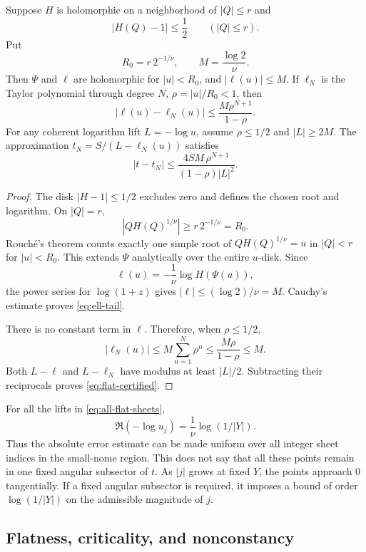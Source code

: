 \begin{theorem}
\label{thm:flat-tail}
Suppose \(H\) is holomorphic on a neighborhood of \(|Q|\le r\)
and
\[
 |H(Q)-1|\le\frac12\qquad (|Q|\le r).
\]
Put
\[
 R_0=r\,2^{-1/\nu},\qquad M=\frac{\log2}{\nu}.
\]
Then \(\Psi\) and \(\ell\) are holomorphic for \(|u|<R_0\),
and \(|\ell(u)|\le M\).
If \(\ell_N\) is the Taylor polynomial through degree \(N\),
\(\rho=|u|/R_0<1\), then
\begin{equation}\label{eq:ell-tail}
 |\ell(u)-\ell_N(u)|
 \le \frac{M\rho^{N+1}}{1-\rho}.
\end{equation}
For any coherent logarithm lift \(L=-\log u\), assume
\(\rho\le1/2\) and \(|L|\ge2M\).
The approximation \(t_N=S/(L-\ell_N(u))\) satisfies
\begin{equation}\label{eq:flat-certified}
 |t-t_N|
 \le
 \frac{4SM\,\rho^{N+1}}{(1-\rho)|L|^2}.
\end{equation}
\end{theorem}
\begin{proof}
The disk \(|H-1|\le1/2\) excludes zero and defines the chosen
root and logarithm.  On \(|Q|=r\),
\[
 |QH(Q)^{1/\nu}|\ge r\,2^{-1/\nu}=R_0.
\]
Rouch\'e's theorem counts exactly one simple root of
\(QH(Q)^{1/\nu}=u\) in \(|Q|<r\) for \(|u|<R_0\).
This extends \(\Psi\) analytically over the entire \(u\)-disk.
Since
\[
 \ell(u)=-\frac1\nu\log H(\Psi(u)),
\]
the power series for \(\log(1+z)\) gives
\(|\ell|\le(\log2)/\nu=M\).
Cauchy's estimate proves \cref{eq:ell-tail}.

There is no constant term in \(\ell\).  Therefore, when
\(\rho\le1/2\),
\[
 |\ell_N(u)|\le M\sum_{n=1}^N\rho^n
                 \le\frac{M\rho}{1-\rho}\le M.
\]
Both \(L-\ell\) and \(L-\ell_N\) have modulus at least
\(|L|/2\).  Subtracting their reciprocals proves
\cref{eq:flat-certified}.
\end{proof}

For all the lifts in \cref{eq:all-flat-sheets},
\[
 \Re(-\log u_j)=\frac1\nu\log(1/|Y|).
\]
Thus the absolute error estimate can be made uniform over all
integer sheet indices in the small-nome region.
This does not say that all these points remain in one fixed
angular subsector of \(t\).  As \(|j|\) grows at fixed \(Y\),
the points approach \(0\) tangentially.
If a fixed angular subsector is required, it imposes a bound of
order \(\log(1/|Y|)\) on the admissible magnitude of \(j\).

\subsection{Flatness, criticality, and nonconstancy}

